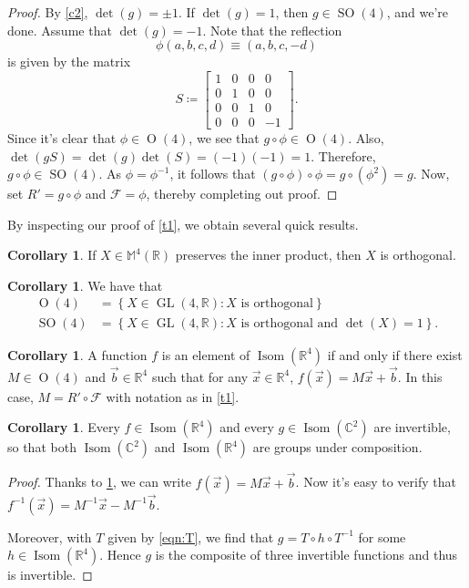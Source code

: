 \documentclass[10pt,letterpaper,cm]{nupset}
\theoremstyle{definition}
\theoremstyle{theorem}
\newtheorem{cor}[definition]{Corollary}
\theoremstyle{remark}
\newcommand{\C}{\mathbb C}
\newcommand{\F}{\mathcal F}
\newcommand{\M}{\mathbb M}
\newcommand{\R}{\mathbb R}
\newcommand{\1}{\mathbf{1}}
\renewcommand{\b}{\vec b}
\newcommand{\x}{\vec x}
\newcommand{\0}{\vec {0}}
\DeclareMathOperator{\ORT}{O}
\DeclareMathOperator{\Isom}{Isom}
\DeclareMathOperator{\SO}{SO}
\DeclareMathOperator{\GL}{GL}
\begin{document}
\begin{proof}
By \cref{c2}, $\det(g)=\pm 1$. If $\det(g)=1$, then $g\in \SO(4)$, and we're done. Assume that $\det(g)={-1}$. 
 Note that the reflection $$\phi(a,b,c,d)\equiv (a,b,c,-d)$$ is given by the matrix $$S\coloneqq\begin{bmatrix} 1 & 0 & 0 & 0 \\ 0&1&0&0\\ 0 & 0 &1 & 0 \\ 0 & 0 &0 &-1 \end{bmatrix}.$$ Since it's clear that $\phi \in \ORT(4)$, we see that $g\circ \phi\in \ORT(4)$. Also, $\det(gS)=\det(g)\det(S)=(-1)(-1)=1$. Therefore, $g\circ \phi \in \SO(4)$. As $\phi = \phi^{-1}$, it follows that $\left(g\circ \phi\right)\circ \phi= g\circ (\phi^2)=g$. Now, set $R'=g\circ \phi$ and $\F=\phi$, thereby completing out proof.


\end{proof}

By inspecting our proof of \cref{t1}, we obtain several quick results.

\begin{cor}\label{orth}
If $X\in \M^4(\R)$ preserves the inner product, then $X$ is orthogonal. 
\end{cor}

\begin{cor}
We have that
\begin{align*}
\ORT(4)&=\left\{X\in \GL(4, \R) : X \text{ is orthogonal}\right\}
\\ \SO(4)&=\left\{X\in \GL(4, \R) : X \text{ is orthogonal and }\det(X)=1\right\}.
\end{align*}
\end{cor}

\begin{cor}\label{af}
A function $f$ is an element of $\Isom(\R^4)$ if and only if there exist $M\in \ORT(4)$ and $\b \in \R^4$ such that for any $\x\in \R^4$, $f(\x)=M\x+\b$. In this case, $M=R'\circ \F$ with notation as in \cref{t1}.
\end{cor}

\begin{cor}\label{c12}
Every  $f\in \Isom(\R^4)$ and every $g\in \Isom(\C^2)$ are invertible, so that  both $\Isom(\C^2)$ and $\Isom(\R^4)$ are groups under composition. 
\end{cor}

\begin{proof}
Thanks to \cref{af}, we can write $f(\x)=M\x+\b$. Now it's easy to verify that \linebreak $f^{-1}(\x)=M^{-1}\x-M^{-1}\b$.

Moreover, with $T$ given by \eqref{eqn:T}, we find that $g=T\circ h \circ T^{-1}$ for some $h\in \Isom(\R^4)$. Hence $g$ is the composite of three invertible functions and thus is invertible. 
\end{proof}
\end{document}
